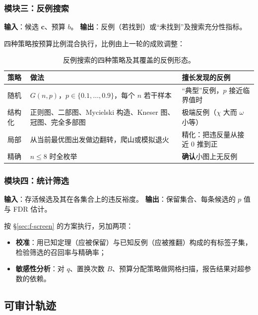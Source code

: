 \subsubsection{模块三：反例搜索}

\textbf{输入}：候选 $\bm{c}$、预算 $b$。
\textbf{输出}：反例（若找到）或“未找到”及搜索充分性指标。

四种策略按预算比例混合执行，比例由上一轮的成败调整：

\begin{table}[H]
\centering
\caption{反例搜索的四种策略及其覆盖的反例形态。}
\label{tab:search}
\small
\begin{tabularx}{\linewidth}{@{}p{1.9cm} >{\raggedright\arraybackslash}X >{\raggedright\arraybackslash}p{4.3cm}@{}}
\toprule
策略 & 做法 & 擅长发现的反例 \\
\midrule
随机 & $G(n,p)$，$p\in\{0.1,\dots,0.9\}$，每个 $n$ 若干样本 & “典型”反例，$p$ 接近临界值时 \\
结构化 & 正则图、二部图、Mycielski 构造、Kneser 图、冠图、完全多部图 & 极端反例（$\chi$ 大而 $\omega$ 小等） \\
局部 & 从当前最优图出发做边翻转，爬山或模拟退火 & 精化：把违反量从接近 $0$ 推到正 \\
精确 & $n\le 8$ 时全枚举 & \textbf{确认}小图上无反例 \\
\bottomrule
\end{tabularx}
\end{table}

\subsubsection{模块四：统计筛选}

\textbf{输入}：存活候选及其在各集合上的违反裕度。
\textbf{输出}：保留集合、每条候选的 $p$ 值与 FDR 估计。

按 \S\ref{sec:f-screen} 的方案执行，另加两项：
\begin{itemize}
  \item \textbf{校准}：用已知定理（应被保留）与已知反例（应被推翻）构成的有标签子集，检验筛选的召回率与精确率；
  \item \textbf{敏感性分析}：对 $q$、置换次数 $B$、预算分配策略做网格扫描，报告结果对超参数的依赖。
\end{itemize}

\subsection{可审计轨迹}
\label{sec:r-trace}

